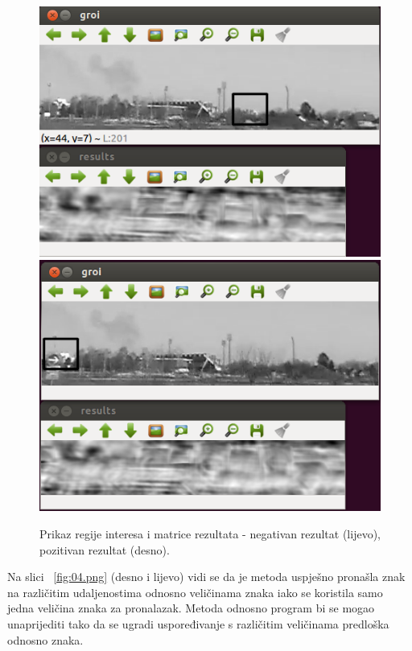 \begin{figure}[!htb]
    \includegraphics[width=\linewidth]{figures/02.png}
\endminipage\hfill
{}
    \includegraphics[width=\linewidth]{figures/03.png}
\endminipage\hfill
\caption{Prikaz regije interesa i matrice rezultata - negativan rezultat
(lijevo), pozitivan rezultat (desno).}
\label{fig:02}
\end{figure}


Na slici ~\ref{fig:04.png} (desno i lijevo) vidi se
da je metoda uspješno pronašla znak na različitim udaljenostima odnosno
veličinama znaka iako se koristila samo jedna veličina znaka za
pronalazak. Metoda odnosno program bi se mogao unaprijediti tako da se
ugradi uspoređivanje s različitim veličinama predloška odnosno znaka.

